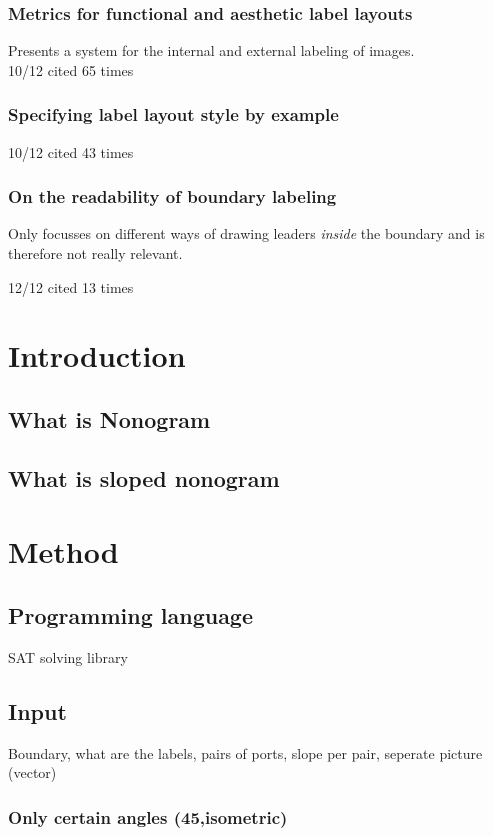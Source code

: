 \documentclass[a4paper]{article}
\begin{document}
\subsubsection{Metrics for functional and aesthetic label layouts \cite{hartmann2005metrics}}
Presents a system for the internal and external labeling of images. \\
10/12 cited 65 times


\subsubsection{Specifying label layout style by example \cite{vollick2007specifying}}
10/12 cited 43 times

\subsubsection{On the readability of boundary labeling \cite{barth2015readability}}
Only focusses on different ways of drawing leaders \textit{inside} the boundary and is therefore not really relevant.

12/12 cited 13 times

\section{Introduction}
\subsection{What is Nonogram}
\subsection{What is sloped nonogram}
\section{Method}
\subsection{Programming language}
SAT solving library
\subsection{Input}
Boundary, what are the labels, pairs of ports, slope per pair, seperate picture (vector)
\subsubsection{Only certain angles (45,isometric)}
\end{document}
